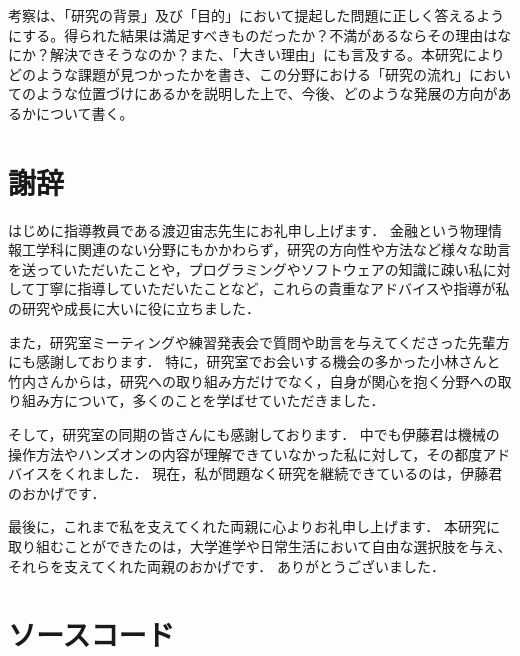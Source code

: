 \documentclass[titlepage]{jsreport}
\begin{document}
考察は、「研究の背景」及び「目的」において提起した問題に正しく答えるようにする。得られた結果は満足すべきものだったか？不満があるならその理由はなにか？解決できそうなのか？また、「大きい理由」にも言及する。本研究によりどのような課題が見つかったかを書き、この分野における「研究の流れ」においてのような位置づけにあるかを説明した上で、今後、どのような発展の方向があるかについて書く。

\chapter*{謝辞}
はじめに指導教員である渡辺宙志先生にお礼申し上げます．
金融という物理情報工学科に関連のない分野にもかかわらず，研究の方向性や方法など様々な助言を送っていただいたことや，プログラミングやソフトウェアの知識に疎い私に対して丁寧に指導していただいたことなど，これらの貴重なアドバイスや指導が私の研究や成長に大いに役に立ちました．


また，研究室ミーティングや練習発表会で質問や助言を与えてくださった先輩方にも感謝しております．
特に，研究室でお会いする機会の多かった小林さんと竹内さんからは，研究への取り組み方だけでなく，自身が関心を抱く分野への取り組み方について，多くのことを学ばせていただきました．

そして，研究室の同期の皆さんにも感謝しております．
中でも伊藤君は機械の操作方法やハンズオンの内容が理解できていなかった私に対して，その都度アドバイスをくれました．
現在，私が問題なく研究を継続できているのは，伊藤君のおかげです．

最後に，これまで私を支えてくれた両親に心よりお礼申し上げます．
本研究に取り組むことができたのは，大学進学や日常生活において自由な選択肢を与え、それらを支えてくれた両親のおかげです．
ありがとうございました．

\appendix

\chapter{ソースコード}





\end{document}
